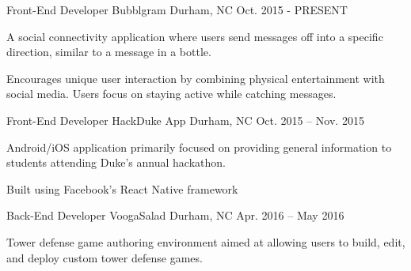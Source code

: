 \begin{cventries}
  \cventry
    {Front-End Developer}
    {Bubblgram}
    {Durham, NC}
    {Oct. 2015 - PRESENT}
    {
      \begin{cvitems}
        \item {A social connectivity application where users send messages off into a specific direction, similar to a message in a bottle. }
        \item {Encourages unique user interaction by combining physical entertainment with social media. Users focus on staying active while catching messages.}
      \end{cvitems}
    }
  \cventry
    {Front-End Developer}
    {HackDuke App}
    {Durham, NC}
    {Oct. 2015 -- Nov. 2015}
    {
      \begin{cvitems}
        \item {Android/iOS application primarily focused on providing general information to students attending Duke's annual hackathon.}
        \item{Built using Facebook's React Native framework}
      \end{cvitems}
    }
  \cventry
    {Back-End Developer}
    {VoogaSalad}
    {Durham, NC}
    {Apr. 2016 -- May 2016}
    {
      \begin{cvitems}
        \item {Tower defense game authoring environment aimed at allowing users to build, edit, and deploy custom tower defense games.}
      \end{cvitems}
    }
\end{cventries}
